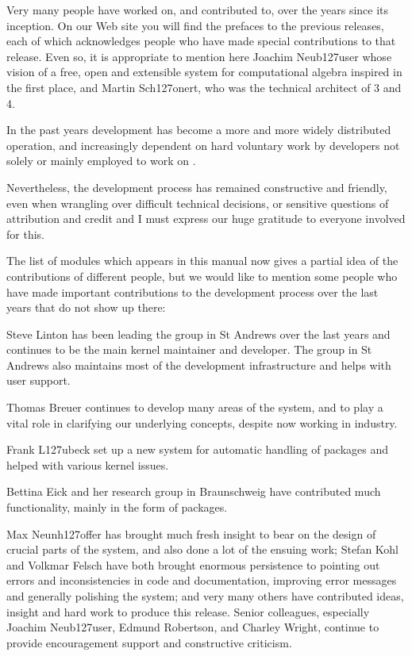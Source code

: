 
Very many people have worked on, and contributed to, {\GAP} over the
years since its inception. On our Web site you will find the prefaces
to the previous releases, each of which acknowledges people who have
made special contributions to that release. Even so, it is appropriate
to mention here Joachim Neub\accent127user whose vision of a free,
open and extensible system for computational algebra inspired {\GAP}
in the first place, and Martin Sch\accent127onert, who was the
technical architect of {\GAP} 3 and {\GAP} 4.

In the past years {\GAP} development
has become a more and more widely distributed operation, and
increasingly dependent on hard voluntary work by developers not solely
or mainly employed to work on {\GAP}. 

Nevertheless, the development
process has remained constructive and friendly, even when wrangling
over difficult technical decisions, or sensitive questions of
attribution and credit and I must express our huge gratitude to
everyone involved for this.

The list of modules which appears in this manual now gives a partial
idea of the contributions of different people, but we would like to
mention some people who have made important contributions to the
development process over the last years that do not show up there:

Steve Linton has been leading the {\GAP} group in St Andrews over the last
years and continues to be the main kernel maintainer and developer. The group
in St Andrews also maintains most of the development infrastructure and 
helps with user support.

Thomas Breuer continues to develop many areas of the system, and
to play a vital role in clarifying our underlying concepts, despite
now working in industry.

Frank L\accent127ubeck set up a new system for automatic handling of
packages and helped with various kernel issues.

Bettina Eick and her research group in Braunschweig have contributed much
functionality, mainly in the form of packages.

Max Neunh\accent127offer has brought much fresh insight to bear on the
design of crucial parts of the system, and also done a lot of the
ensuing work; Stefan Kohl and Volkmar Felsch have both brought
enormous persistence to pointing out errors and inconsistencies in code and 
documentation, improving error messages and generally polishing the
system; and very many others have contributed ideas, insight and hard
work to produce this release. Senior colleagues, especially Joachim
Neub\accent127user, Edmund Robertson, and Charley Wright, continue to
provide encouragement support and constructive criticism.




